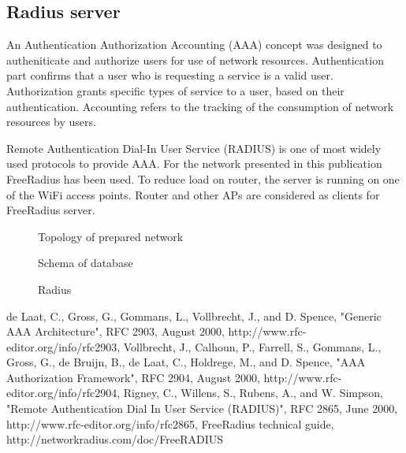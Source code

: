 \documentclass{llncs}
\begin{document}
\subsection{Radius server}
An Authentication Authorization Accounting (AAA) \cite{rfc2903}\cite{rfc2904}
concept was designed to autheniticate and authorize users for use of network
resources. Authentication part confirms that a user who is requesting a service
is a valid user. Authorization grants specific types of service to a user, based
on their authentication. Accounting refers to the tracking of the consumption of
network resources by users.

Remote Authentication Dial-In User Service (RADIUS) \cite{rfc2865} is one of
most widely used protocols to provide AAA. For the network presented in this
publication FreeRadius \cite{freeRadius} has been used. To reduce load on
router, the server is running on one of the WiFi access points. Router and other
APs are considered as clients for FreeRadius server. 

\begin{figure}
\vspace{-15pt}
\caption{Topology of prepared network}
\end{figure}

\begin{figure}
\vspace{-15pt}
\caption{Schema of database}
\end{figure}

\begin{figure}
\vspace{-15pt}
\caption{Radius}
\end{figure}

%
%
\begin{thebibliography}{}
%
de Laat, C., Gross, G., Gommans, L., Vollbrecht, J., and D. Spence, "Generic AAA
Architecture", RFC 2903, August 2000, http://www.rfc-editor.org/info/rfc2903,
Vollbrecht, J., Calhoun, P., Farrell, S., Gommans, L., Gross, G., de Bruijn, B.,
de Laat, C., Holdrege, M., and D. Spence, "AAA Authorization Framework", RFC
2904, August 2000, http://www.rfc-editor.org/info/rfc2904,
Rigney, C., Willens, S., Rubens, A., and W. Simpson, "Remote  Authentication
Dial In User Service (RADIUS)", RFC 2865, June 2000,
http://www.rfc-editor.org/info/rfc2865,
FreeRadius technical guide,
http://networkradius.com/doc/FreeRADIUS%
\end{thebibliography}



\clearpage
{} %
\renewcommand{\indexname}{Author Index}
\printindex
\clearpage
{} %
\renewcommand{\indexname}{Subject Index}

\end{document}
